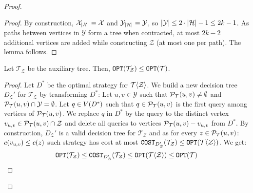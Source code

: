 \begin{theorem}
\begin{proof}
\begin{lemma}
\begin{proof}
        By construction, $\mathcal{X}_{\mathopen{}\left| \mathcal{X} \right|}=\mathcal{X}$ and $\mathcal{Y}_{\mathopen{}\left| \mathcal{H} \right|}=\mathcal{Y}$, so $\mathopen{}\left| \mathcal{Y} \right| \leq 2\cdot \mathopen{}\left| \mathcal{H} \right| - 1 \leq 2k-1$.
        As paths between vertices in $\mathcal{Y}$ form a tree when contracted, at most $2k-2$ additional vertices are added while constructing $\mathcal{Z}$ (at most one per path). The lemma follows.
    \end{proof}
\end{lemma}
\begin{lemma}\label{lemma:auxTreeCost}
    Let $\mathcal{T}_{\mathcal{Z}}$ be the auxiliary tree. Then, $\texttt{OPT}\mathopen{}\left( \mathcal{T}_{\mathcal{Z}} \right)\leq \texttt{OPT}\mathopen{}\left( \mathcal{T} \right)$.
    \begin{proof}
        Let $D^*$ be the optimal strategy for $\mathcal{T}\mathopen{}\langle \mathcal{Z} \rangle$. We build a new decision tree $D_{\mathcal{Z}}'$ for $\mathcal{T}_{\mathcal{Z}}$ by transforming $D^*$: Let $u,v\in \mathcal{Y}$ such that $\mathcal{P}_{\mathcal{T}}\mathopen{}\left( u, v \right)\neq\emptyset$ and $\mathcal{P}_{\mathcal{T}}\mathopen{}\left( u, v \right)\cap \mathcal{Y}=\emptyset$. Let $q\in V\mathopen{}\left( D^* \right)$ such that $q\in \mathcal{P}_{\mathcal{T}}\mathopen{}\left( u, v \right)$ is the first query among vertices of $\mathcal{P}_{\mathcal{T}}\mathopen{}\left( u, v \right)$. We replace $q$ in $D^*$ by the query to the distinct vertex $v_{u,v}\in \mathcal{P}_{\mathcal{T}}\mathopen{}\left( u, v \right)\cap \mathcal{Z}$ and delete all queries to vertices $\mathcal{P}_{\mathcal{T}}\mathopen{}\left( u, v \right)-v_{u,v}$ from $D^*$. By construction, $D_{\mathcal{Z}}'$ is a valid decision tree for $\mathcal{T}_{\mathcal{Z}}$ and as for every $z\in \mathcal{P}_{\mathcal{T}}\mathopen{}\left( u, v \right)$: $c\mathopen{}\left( v_{u,v} \right)\leq c\mathopen{}\left( z \right)$ such strategy has cost at most $\texttt{COST}_{D_{\mathcal{Z}}'}\mathopen{}\left( \mathcal{T}_{\mathcal{Z}} \right)\leq \texttt{OPT}\mathopen{}\left( \mathcal{T}\mathopen{}\langle \mathcal{Z} \rangle \right)$. We get:
        $$
        \texttt{OPT}\mathopen{}\left( \mathcal{T}_{\mathcal{Z}} \right)\leq \texttt{COST}_{D_{\mathcal{Z}}'}\mathopen{}\left( \mathcal{T}_{\mathcal{Z}} \right)\leq \texttt{OPT}\mathopen{}\left( \mathcal{T}\mathopen{}\langle \mathcal{Z} \rangle \right)\leq \texttt{OPT}\mathopen{}\left( \mathcal{T} \right)
        $$


\end{proof}
\end{lemma}
\end{proof}
\end{theorem}
